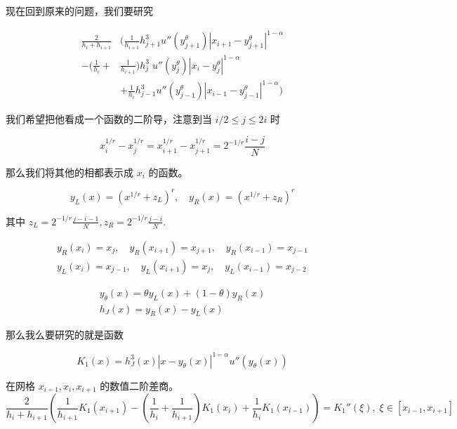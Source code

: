 \documentclass{ctexart}
\theoremstyle{definition}
\theoremstyle{remark}
\numberwithin{equation}{section}
\begin{document}
现在回到原来的问题，我们要研究

\begin{equation}
    \begin{aligned}
        \frac{2}{h_i + h_{i+1}}
                             & ( \frac{1}{h_{i+1}}  h_{j+1}^{3} u''(y_{j+1}^\theta) |x_{i+1} - y_{j+1}^\theta|^{1-\alpha} \\
        - (\frac{1}{h_{i}} + & \frac{1}{h_{i+1}}) h_j^{3} \; u''(y_j^\theta) |x_i - y_j^\theta|^{1-\alpha}                \\
                             & +  \frac{1}{h_{i}} h_{j-1}^{3} u''(y_{j-1}^\theta) |x_{i-1} - y_{j-1}^\theta|^{1-\alpha} )
    \end{aligned}
\end{equation}

我们希望把他看成一个函数的二阶导，注意到当 \(i/2 \le j \le 2i\) 时

\begin{equation}
    x_i^{1/r} - x_j^{1/r} = x_{i+1}^{1/r} - x_{j+1}^{1/r} = 2^{-1/r}\frac{i-j}{N}
\end{equation}

那么我们将其他的相都表示成 \(x_i\) 的函数。

\begin{equation}
    y_L(x) = (x^{1/r} + z_L)^r , \quad y_R(x) =  (x^{1/r} + z_R)^r
\end{equation}

其中 \(z_L = 2^{-1/r}\frac{j-i-1}{N}, z_R = 2^{-1/r}\frac{j-i}{N}\).

\begin{gather}
    y_R(x_i)=x_j, \quad y_R(x_{i+1}) = x_{j+1}, \quad y_R(x_{i-1}) = x_{j-1} \\
    y_L(x_i) = x_{j-1} ,\quad y_L(x_{i+1}) = x_{j}, \quad y_L(x_{i-1}) = x_{j-2}
\end{gather}

\begin{gather}
    y_\theta(x) = \theta y_L(x) + (1-\theta) y_R(x)      \\
    h_J(x) = y_R(x) - y_L(x)
\end{gather}

那么我么要研究的就是函数

\begin{equation}
    K_1(x) = h_J^3(x) |x - y_\theta(x)|^{1-\alpha} u''(y_\theta(x))
\end{equation}

在网格 \(x_{i-1}, x_i , x_{i+1}\) 的数值二阶差商。
\begin{equation}
    \frac{2}{h_i + h_{i+1}}
    ( \frac{1}{h_{i+1}}  K_1(x_{i+1}) - (\frac{1}{h_{i}} + \frac{1}{h_{i+1}}) K_1(x_{i}) + \frac{1}{h_{i}} K_1(x_{i-1})) = K_1''(\xi), \;\xi\in [x_{i-1}, x_{i+1}]
\end{equation}
\end{document}
